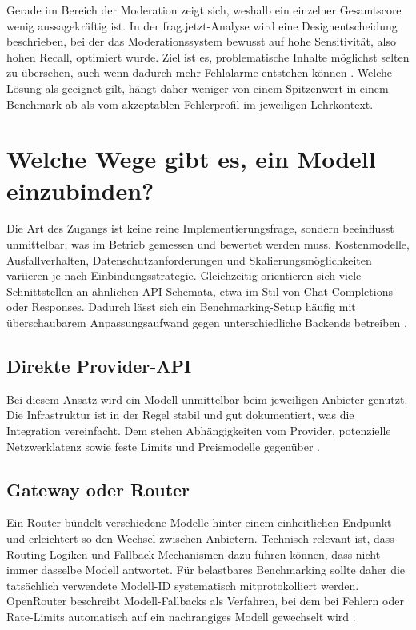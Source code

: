 Gerade im Bereich der Moderation zeigt sich, weshalb ein einzelner Gesamtscore wenig aussagekräftig ist. In der frag.jetzt-Analyse wird eine Designentscheidung beschrieben, bei der das Moderationssystem bewusst auf hohe Sensitivität, also hohen Recall, optimiert wurde. Ziel ist es, problematische Inhalte möglichst selten zu übersehen, auch wenn dadurch mehr Fehlalarme entstehen können \parencite{fragjetzt-analyse}. Welche Lösung als geeignet gilt, hängt daher weniger von einem Spitzenwert in einem Benchmark ab als vom akzeptablen Fehlerprofil im jeweiligen Lehrkontext.

\section{Welche Wege gibt es, ein Modell einzubinden?}

Die Art des Zugangs ist keine reine Implementierungsfrage, sondern beeinflusst unmittelbar, was im Betrieb gemessen und bewertet werden muss. Kostenmodelle, Ausfallverhalten, Datenschutzanforderungen und Skalierungsmöglichkeiten variieren je nach Einbindungsstrategie. Gleichzeitig orientieren sich viele Schnittstellen an ähnlichen API-Schemata, etwa im Stil von Chat-Completions oder Responses. Dadurch lässt sich ein Benchmarking-Setup häufig mit überschaubarem Anpassungsaufwand gegen unterschiedliche Backends betreiben \parencite{openai-chatcompletions,openrouter-quickstart,llamacpp-server-readme,webllm-github}.

\subsection{Direkte Provider-API}

Bei diesem Ansatz wird ein Modell unmittelbar beim jeweiligen Anbieter genutzt. Die Infrastruktur ist in der Regel stabil und gut dokumentiert, was die Integration vereinfacht. Dem stehen Abhängigkeiten vom Provider, potenzielle Netzwerklatenz sowie feste Limits und Preismodelle gegenüber \parencite{openai-chatcompletions}.

\subsection{Gateway oder Router}

Ein Router bündelt verschiedene Modelle hinter einem einheitlichen Endpunkt und erleichtert so den Wechsel zwischen Anbietern. Technisch relevant ist, dass Routing-Logiken und Fallback-Mechanismen dazu führen können, dass nicht immer dasselbe Modell antwortet. Für belastbares Benchmarking sollte daher die tatsächlich verwendete Modell-ID systematisch mitprotokolliert werden. OpenRouter beschreibt Modell-Fallbacks als Verfahren, bei dem bei Fehlern oder Rate-Limits automatisch auf ein nachrangiges Modell gewechselt wird \parencite{openrouter-model-fallbacks,openrouter-quickstart}.

